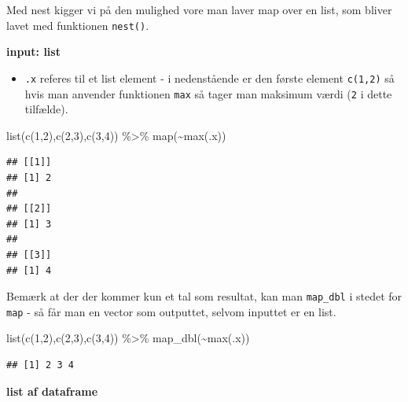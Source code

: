 \documentclass[
]{book}
\newenvironment{Shaded}{\begin{snugshade}}{\end{snugshade}}
\newcommand{\DecValTok}[1]{\textcolor[rgb]{0.00,0.00,0.81}{#1}}
\newcommand{\FunctionTok}[1]{\textcolor[rgb]{0.00,0.00,0.00}{#1}}
\newcommand{\NormalTok}[1]{#1}
\newcommand{\SpecialCharTok}[1]{\textcolor[rgb]{0.00,0.00,0.00}{#1}}
\providecommand{\tightlist}{%
  \setlength{\itemsep}{0pt}\setlength{\parskip}{0pt}}
\begin{document}
Med nest kigger vi på den mulighed vore man laver map over en list, som bliver lavet med funktionen \texttt{nest()}.

\textbf{input: list}

\begin{itemize}
\tightlist
\item
  \texttt{.x} referes til et list element - i nedenstående er den første element \texttt{c(1,2)} så hvis man anvender funktionen \texttt{max} så tager man maksimum værdi (\texttt{2} i dette tilfælde).
\end{itemize}

\begin{Shaded}
\begin{Highlighting}[]
\FunctionTok{list}\NormalTok{(}\FunctionTok{c}\NormalTok{(}\DecValTok{1}\NormalTok{,}\DecValTok{2}\NormalTok{),}\FunctionTok{c}\NormalTok{(}\DecValTok{2}\NormalTok{,}\DecValTok{3}\NormalTok{),}\FunctionTok{c}\NormalTok{(}\DecValTok{3}\NormalTok{,}\DecValTok{4}\NormalTok{)) }\SpecialCharTok{\%\textgreater{}\%} \FunctionTok{map}\NormalTok{(}\SpecialCharTok{\textasciitilde{}}\FunctionTok{max}\NormalTok{(.x))}
\end{Highlighting}
\end{Shaded}

\begin{verbatim}
## [[1]]
## [1] 2
## 
## [[2]]
## [1] 3
## 
## [[3]]
## [1] 4
\end{verbatim}

Bemærk at der der kommer kun et tal som resultat, kan man \texttt{map\_dbl} i stedet for \texttt{map} - så får man en vector som outputtet, selvom inputtet er en list.

\begin{Shaded}
\begin{Highlighting}[]
\FunctionTok{list}\NormalTok{(}\FunctionTok{c}\NormalTok{(}\DecValTok{1}\NormalTok{,}\DecValTok{2}\NormalTok{),}\FunctionTok{c}\NormalTok{(}\DecValTok{2}\NormalTok{,}\DecValTok{3}\NormalTok{),}\FunctionTok{c}\NormalTok{(}\DecValTok{3}\NormalTok{,}\DecValTok{4}\NormalTok{)) }\SpecialCharTok{\%\textgreater{}\%} \FunctionTok{map\_dbl}\NormalTok{(}\SpecialCharTok{\textasciitilde{}}\FunctionTok{max}\NormalTok{(.x))}
\end{Highlighting}
\end{Shaded}

\begin{verbatim}
## [1] 2 3 4
\end{verbatim}

\textbf{list af dataframe}
\end{document}
